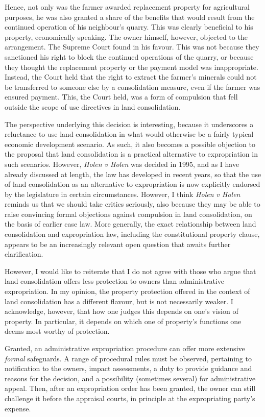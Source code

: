 Hence, not only was the farmer awarded replacement property for agricultural purposes, he was also granted a share of the benefits that would result from the continued operation of his neighbour's quarry. This was clearly beneficial to his property, economically speaking. The owner himself, however, objected to the arrangement. The Supreme Court found in his favour. This was not because they sanctioned his right to block the continued operations of the quarry, or because they thought the replacement property or the payment model was inappropriate. Instead, the Court held that the right to extract the farmer's minerals could not be transferred to someone else by a consolidation measure, even if the farmer was ensured payment. This, the Court held, was a form of compulsion that fell outside the scope of use directives in land consolidation.

The perspective underlying this decision is interesting, because it underscores a reluctance to use land consolidation in what would otherwise be a fairly typical economic development scenario. As such, it also becomes a possible objection to the proposal that land consolidation is a practical alternative to expropriation in such scenarios. However, {\it Holen v Holen} was decided in 1995, and as I have already discussed at length, the law has developed in recent years, so that the use of land consolidation as an alternative to expropriation is now explicitly endorsed by the legislature in certain circumstances. However, I think {\it Holen v Holen} reminds us that we should take critics seriously, also because they may be able to raise convincing formal objections against compulsion in land consolidation, on the basis of earlier case law. More generally, the exact relationship between land consolidation and expropriation law, including the constitutional property clause, appears to be an increasingly relevant open question that awaits further clarification.

However, I would like to reiterate that I do not agree with those who argue that land consolidation offers less protection to owners than administrative expropriation. In my opinion, the property protection offered in the context of land consolidation has a different flavour, but is not necessarily weaker. I acknowledge, however, that how one judges this depends on one's vision of property. In particular, it depends on which one of property's functions one deems most worthy of protection.

Granted, an administrative expropriation procedure can offer more extensive {\it formal} safeguards. A range of procedural rules must be observed, pertaining to notification to the owners, impact assessments, a duty to provide guidance and reasons for the decision, and a possibility (sometimes several) for administrative appeal. Then, after an expropriation order has been granted, the owner can still challenge it before the appraisal courts, in principle at the expropriating party's expense. 


